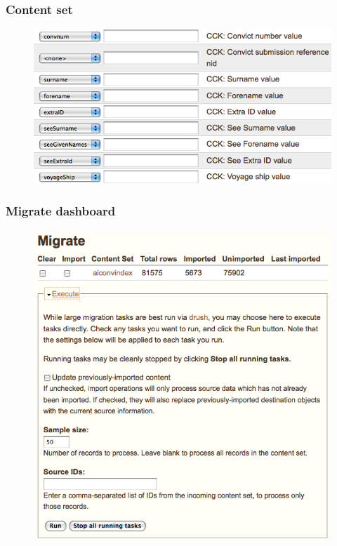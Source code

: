 \documentclass[ignorenonframetext,11pt]{beamer}
\begin{document}
\begin{frame}
\frametitle{Content set}
\label{contentset}

\begin{figure}
	\label{migratecontentset}
	\begin{center}
	\includegraphics[keepaspectratio,width=\textwidth, height=.75\textheight]{images/aiconvindex.png}
	\end{center}
	\end{figure}
	



\end{frame}
		

\begin{frame}
\frametitle{Migrate dashboard}
\label{migratedashboard}

\begin{figure}
	\label{migratedashboard}
	\begin{center}
	\includegraphics[keepaspectratio,width=\textwidth, height=.75\textheight]{images/Migrate.png}
	\end{center}
	\end{figure}
	



\end{frame}
		
\end{document}
